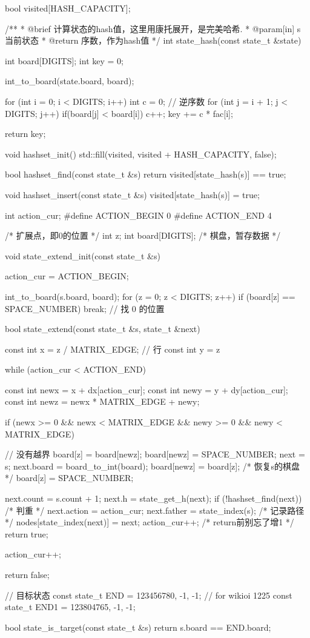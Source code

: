 \begin{Codex}[label=eight_digits_astar.c]
bool visited[HASH_CAPACITY];

/**
 * @brief 计算状态的hash值，这里用康托展开，是完美哈希.
 * @param[in] s 当前状态
 * @return 序数，作为hash值
 */
int state_hash(const state_t &state) {
    int board[DIGITS];
    int key = 0;

    int_to_board(state.board, board);

    for (int i = 0; i < DIGITS; i++) {
        int c = 0; // 逆序数
        for (int j = i + 1; j < DIGITS; j++) {
            if(board[j] < board[i]) {
                c++;
            }
        }
        key += c * fac[i];
    }

    return key;
}

void hashset_init() {
    std::fill(visited, visited + HASH_CAPACITY, false);
}

bool hashset_find(const state_t &s) {
    return visited[state_hash(s)] == true;
}

void hashset_insert(const state_t &s) {
    visited[state_hash(s)] = true;
}

int action_cur;
#define ACTION_BEGIN 0
#define ACTION_END 4

/* 扩展点，即0的位置 */
int z;
int board[DIGITS];  /* 棋盘，暂存数据 */

void state_extend_init(const state_t &s) {
    action_cur = ACTION_BEGIN;

    int_to_board(s.board, board);
    for (z = 0; z < DIGITS; z++) {
        if (board[z] == SPACE_NUMBER) {
            break;  // 找 0 的位置
        }
    }
}

bool state_extend(const state_t &s, state_t &next) {
    const int x = z / MATRIX_EDGE; // 行
    const int y = z %

    while (action_cur < ACTION_END) {
        const int newx = x + dx[action_cur];
        const int newy = y + dy[action_cur];
        const int newz = newx * MATRIX_EDGE + newy;

        if (newx >= 0 && newx < MATRIX_EDGE && newy >= 0 &&
                newy < MATRIX_EDGE) { // 没有越界
            board[z] = board[newz];
            board[newz] = SPACE_NUMBER;
            next = s;
            next.board = board_to_int(board);
            board[newz] = board[z]; /* 恢复s的棋盘 */
            board[z] = SPACE_NUMBER;

            next.count = s.count + 1;
            next.h = state_get_h(next);
            if (!hashset_find(next)) { /* 判重 */
                next.action = action_cur;
                next.father = state_index(s);
                /* 记录路径 */
                nodes[state_index(next)] = next;
                action_cur++; /* return前别忘了增1 */
                return true;
            }
        }
        action_cur++;
    }
    return false;
}

// 目标状态
const state_t END = {123456780, -1, -1};
// for wikioi 1225
const state_t END1 = {123804765, -1, -1};

bool state_is_target(const state_t &s) {
    return s.board == END.board;
}
\end{Codex}


